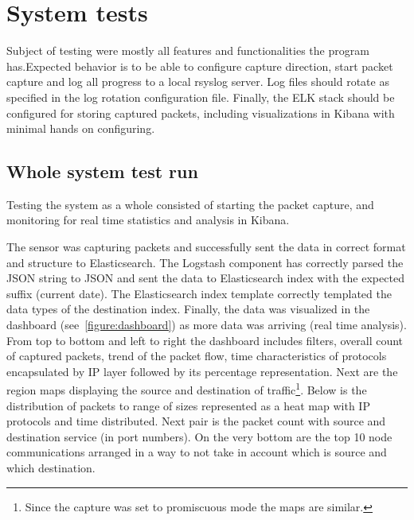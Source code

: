 \documentclass[12pt,a4paper,twoside]{report}
\begin{document}
\chapter{System tests} \label{tests}
	Subject of testing were mostly all features and functionalities the program has.Expected behavior is to be able to configure capture direction, start packet capture and log all progress to a local rsyslog server. Log files should rotate as specified in the log rotation configuration file. Finally, the ELK stack should be configured for storing captured packets, including visualizations in Kibana with minimal hands on configuring.
	\section{Whole system test run} \label{tests:one}
		Testing the system as a whole consisted of starting the packet capture, and monitoring for real time statistics and analysis in Kibana.\par
		The sensor was capturing packets and successfully sent the data in correct format and structure to Elasticsearch. The Logstash component has correctly parsed the JSON string to JSON and sent the data to Elasticsearch index with the expected suffix (current date). The Elasticsearch index template correctly templated the data types of the destination index. Finally, the data was visualized in the dashboard (see~\autoref{figure:dashboard}) as more data was arriving (real time analysis). From top to bottom and left to right the dashboard includes filters, overall count of captured packets, trend of the packet flow, time characteristics of protocols encapsulated by IP layer followed by its percentage representation. Next are the region maps displaying the source and destination of traffic\footnote{Since the capture was set to promiscuous mode the maps are similar.}. Below is the distribution of packets to range of sizes represented as a heat map with IP protocols and time distributed. Next pair is the packet count with source and destination service (in port numbers). On the very bottom are the top 10 node communications arranged in a way to not take in account which is source and which destination.
\end{document}
